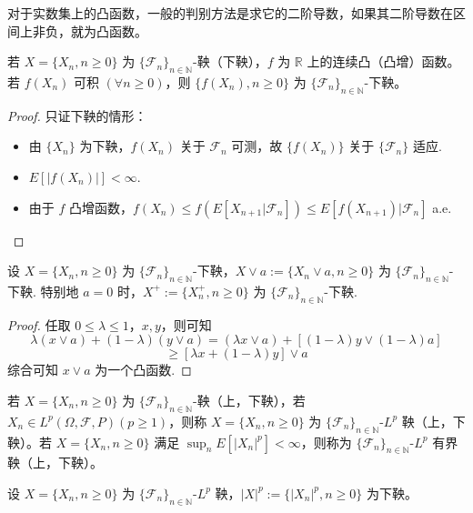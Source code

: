 \documentclass[lang=cn,10pt,thmcnt=section]{elegantbook}
\begin{document}
对于实数集上的凸函数，一般的判别方法是求它的二阶导数，如果其二阶导数在区间上非负，就为凸函数。
\begin{theorem}
	若 $X = \{X_n, n \geq 0\}$ 为 $\{\mathcal{F}_n\}_{n \in \mathbb{N}}$-鞅（下鞅），$f$ 为 $\mathbb{R}$ 上的连续凸（凸增）函数。若 $f(X_n)$ 可积 $(\forall n \geq 0)$，则 $\{f(X_n), n \geq 0\}$ 为 $\{\mathcal{F}_n\}_{n \in \mathbb{N}}$-下鞅。

\end{theorem}
\begin{proof}
	只证下鞅的情形：
\begin{itemize}
    \item 由 $\{X_n\}$ 为下鞅，$f(X_n)$ 关于 $\mathcal{F}_n$ 可测，故 $\{f(X_n)\}$ 关于 $\{\mathcal{F}_n\}$ 适应.
    \item $E[|f(X_n)|] < \infty$.
    \item 由于 $f$ 凸增函数，$f(X_n) \leq f(E[X_{n+1}|\mathcal{F}_n]) \leq E[f(X_{n+1})|\mathcal{F}_n]$ a.e.
\end{itemize}
\end{proof}
\begin{corollary}
	设 $X = \{X_n, n \geq 0\}$ 为 $\{\mathcal{F}_n\}_{n \in \mathbb{N}}$-下鞅，$X \vee a := \{X_n \vee a, n \geq 0\}$ 为 $\{\mathcal{F}_n\}_{n \in \mathbb{N}}$-下鞅. 特别地 $a = 0$ 时，$X^+ := \{X_n^+, n \geq 0\}$ 为 $\{\mathcal{F}_n\}_{n \in \mathbb{N}}$-下鞅.

\end{corollary}
\begin{proof}
	任取 $0 \leq \lambda \leq 1$，$x, y$，则可知
\[
\lambda (x \vee a) + (1 - \lambda)(y \vee a) = (\lambda x \vee a) + [(1 - \lambda)y \vee (1 - \lambda)a]
\]
\[
\geq [ \lambda x + (1 - \lambda)y] \vee a
\]
综合可知 $x \vee a$ 为一个凸函数.
\end{proof}
\begin{definition}
	若 $X = \{X_n, n \geq 0\}$ 为 $\{\mathcal{F}_n\}_{n \in \mathbb{N}}$-鞅（上，下鞅），若 $X_n \in L^p(\Omega, \mathcal{F}, P) (p \geq 1)$，则称 $X = \{X_n, n \geq 0\}$ 为 $\{\mathcal{F}_n\}_{n \in \mathbb{N}}$-$L^p$ 鞅（上，下鞅）。若 $X = \{X_n, n \geq 0\}$ 满足 $\sup_n E[|X_n|^p] < \infty$，则称为 $\{\mathcal{F}_n\}_{n \in \mathbb{N}}$-$L^p$ 有界鞅（上，下鞅）。
\end{definition}
\begin{corollary}
	设 $X = \{X_n, n \geq 0\}$ 为 $\{\mathcal{F}_n\}_{n \in \mathbb{N}}$-$L^p$ 鞅，$|X|^p := \{|X_n|^p, n \geq 0\}$ 为下鞅。

\end{corollary}
\end{document}
